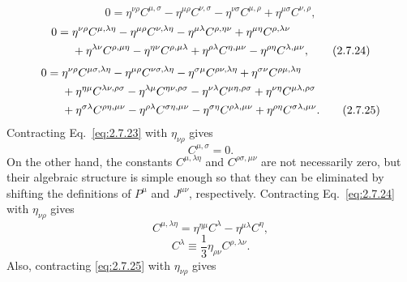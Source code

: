 \begin{equation}
  0=\eta^{\nu\rho}C^{\mu,\sigma}
    -\eta^{\mu\rho}C^{\nu,\sigma}
    -\eta^{\nu\sigma}C^{\mu,\rho}
    +\eta^{\mu\sigma}C^{\nu,\rho},
  \tag{2.7.23}\label{eq:2.7.23}
\end{equation}
\begin{align}
  0={}&\eta^{\nu\rho}C^{\mu,\lambda\eta}
    -\eta^{\mu\rho}C^{\nu,\lambda\eta}
    -\eta^{\mu\lambda}C^{\rho,\eta\nu}
    +\eta^{\mu\eta}C^{\rho,\lambda\nu}
  \notag\\
  &+\eta^{\lambda\nu}C^{\rho,\mu\eta}
    -\eta^{\eta\nu}C^{\rho,\mu\lambda}
    +\eta^{\rho\lambda}C^{\eta,\mu\nu}
    -\eta^{\rho\eta}C^{\lambda,\mu\nu},
  \tag{2.7.24}\label{eq:2.7.24}
\end{align}
\begin{align}
  0={}&\eta^{\nu\rho}C^{\mu\sigma,\lambda\eta}
    -\eta^{\mu\rho}C^{\nu\sigma,\lambda\eta}
    -\eta^{\sigma\mu}C^{\rho\nu,\lambda\eta}
    +\eta^{\sigma\nu}C^{\rho\mu,\lambda\eta}
  \notag\\
  &+\eta^{\eta\mu}C^{\lambda\nu,\rho\sigma}
    -\eta^{\lambda\mu}C^{\eta\nu,\rho\sigma}
    -\eta^{\nu\lambda}C^{\mu\eta,\rho\sigma}
    +\eta^{\nu\eta}C^{\mu\lambda,\rho\sigma}
  \notag\\
  &+\eta^{\sigma\lambda}C^{\rho\eta,\mu\nu}
    -\eta^{\rho\lambda}C^{\sigma\eta,\mu\nu}
    -\eta^{\sigma\eta}C^{\rho\lambda,\mu\nu}
    +\eta^{\rho\eta}C^{\sigma\lambda,\mu\nu}.
  \tag{2.7.25}\label{eq:2.7.25}
\end{align}
Contracting Eq.~\eqref{eq:2.7.23} with $\eta_{\nu\rho}$ gives
\begin{equation}
  C^{\mu,\sigma}=0.
  \tag{2.7.26}\label{eq:2.7.26}
\end{equation}
On the other hand, the constants $C^{\mu,\lambda\eta}$ and
$C^{\rho\sigma,\mu\nu}$ are not necessarily zero, but their algebraic
structure is simple enough so that they can be eliminated by shifting the
definitions of $P^\mu$ and $J^{\mu\nu}$, respectively. Contracting Eq.~\eqref{eq:2.7.24}
with $\eta_{\nu\rho}$ gives
\begin{equation}
  C^{\mu,\lambda\eta}=\eta^{\eta\mu}C^\lambda
    -\eta^{\mu\lambda}C^\eta,
  \tag{2.7.27}\label{eq:2.7.27}
\end{equation}
\begin{equation}
  C^\lambda\equiv\frac{1}{3}\eta_{\rho\nu}C^{\rho,\lambda\nu}.
  \tag{2.7.28}\label{eq:2.7.28}
\end{equation}
Also, contracting \eqref{eq:2.7.25} with $\eta_{\nu\rho}$ gives
